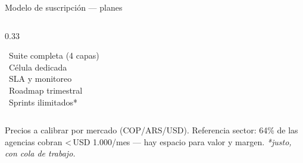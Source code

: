 \documentclass[aspectratio=169,10pt]{beamer}
\newcommand{\chk}{{\color{wmint}\faCheckCircle}~}
\begin{document}
\begin{frame}{Modelo de suscripción — planes}
\begin{columns}[T]
\begin{column}{0.33\textwidth}
\begin{tcolorbox}[enhanced,colback=white,colframe=wcyan,boxrule=1pt,arc=8pt,drop fuzzy shadow=black!12,top=8pt,bottom=8pt]
        \raggedright\footnotesize
        \chk Suite completa (4 capas)\\
        \chk Célula dedicada\\
        \chk SLA y monitoreo\\
        \chk Roadmap trimestral\\
        \chk Sprints ilimitados*
      \end{tcolorbox}
    \end{column}
  \end{columns}
  \vspace{4pt}
  \begin{center}\footnotesize\color{wgray}
    Precios a calibrar por mercado (COP/ARS/USD). Referencia sector: 64\% de las agencias cobran <\,USD 1.000/mes — hay espacio para valor y margen. \emph{*justo, con cola de trabajo.}
  \end{center}
\end{frame}
\end{document}
